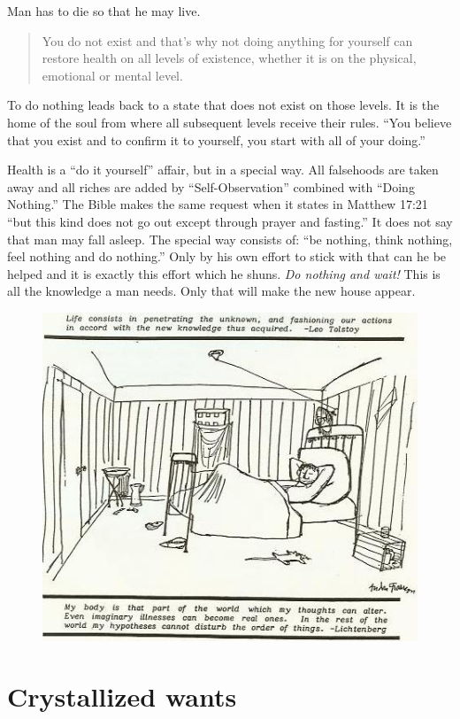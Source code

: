 \documentclass[12pt,letterpaper]{article}
\begin{document}
Man has to die so that he may live.
\begin{quote} You do not exist and that's why not doing anything for
yourself can restore health on all levels of existence, whether it is
on the physical, emotional or mental level.
\end{quote} To do nothing leads back to a state that does not exist on
those levels. It is the home of the soul from where all subsequent
levels receive their rules. ``You believe that you exist and to
confirm it to yourself, you start with all of your doing.''

Health is a ``do it yourself'' affair, but in a special way. All
falsehoods are taken away and all riches are added by
``Self-Observation'' combined with ``Doing Nothing.'' The Bible makes
the same request when it states in Matthew 17:21 ``but this kind does
not go out except through prayer and fasting.'' It does not say that
man may fall asleep. The special way consists of: ``be nothing, think
nothing, feel nothing and do nothing.'' Only by his own effort to
stick with that can he be helped and it is exactly this effort which
he shuns. \emph{Do nothing and wait!} This is all the knowledge a man
needs. Only that will make the new house appear.

\begin{figure} \centering
  \includegraphics[width=\textwidth,bb= 0 0 453 396]{p29.jpg}
\end{figure}


\section{Crystallized wants}
\label{sec:cw}
\end{document}
